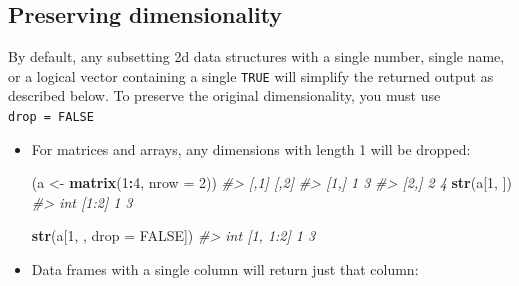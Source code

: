 \documentclass[]{book}
\newenvironment{Shaded}{\begin{snugshade}}{\end{snugshade}}
\newcommand{\KeywordTok}[1]{\textcolor[rgb]{0.13,0.29,0.53}{\textbf{#1}}}
\newcommand{\DataTypeTok}[1]{\textcolor[rgb]{0.13,0.29,0.53}{#1}}
\newcommand{\DecValTok}[1]{\textcolor[rgb]{0.00,0.00,0.81}{#1}}
\newcommand{\StringTok}[1]{\textcolor[rgb]{0.31,0.60,0.02}{#1}}
\newcommand{\CommentTok}[1]{\textcolor[rgb]{0.56,0.35,0.01}{\textit{#1}}}
\newcommand{\OtherTok}[1]{\textcolor[rgb]{0.56,0.35,0.01}{#1}}
\newcommand{\OperatorTok}[1]{\textcolor[rgb]{0.81,0.36,0.00}{\textbf{#1}}}
\newcommand{\NormalTok}[1]{#1}
\theoremstyle{definition}
\theoremstyle{definition}
\theoremstyle{definition}
\theoremstyle{remark}
\begin{document}
\subsection{Preserving dimensionality}\label{preserving-dimensionality}

By default, any subsetting 2d data structures with a single number,
single name, or a logical vector containing a single \texttt{TRUE} will
simplify the returned output as described below. To preserve the
original dimensionality, you must use \texttt{drop\ =\ FALSE}

\begin{itemize}
\item
  For matrices and arrays, any dimensions with length 1 will be dropped:

\begin{Shaded}
\begin{Highlighting}[]
\NormalTok{(a <-}\StringTok{ }\KeywordTok{matrix}\NormalTok{(}\DecValTok{1}\OperatorTok{:}\DecValTok{4}\NormalTok{, }\DataTypeTok{nrow =} \DecValTok{2}\NormalTok{))}
\CommentTok{#>      [,1] [,2]}
\CommentTok{#> [1,]    1    3}
\CommentTok{#> [2,]    2    4}
\KeywordTok{str}\NormalTok{(a[}\DecValTok{1}\NormalTok{, ])}
\CommentTok{#>  int [1:2] 1 3}

\KeywordTok{str}\NormalTok{(a[}\DecValTok{1}\NormalTok{, , }\DataTypeTok{drop =} \OtherTok{FALSE}\NormalTok{])}
\CommentTok{#>  int [1, 1:2] 1 3}
\end{Highlighting}
\end{Shaded}
\item
  Data frames with a single column will return just that column:

\begin{Shaded}
\end{Shaded}
\end{itemize}
\end{document}
